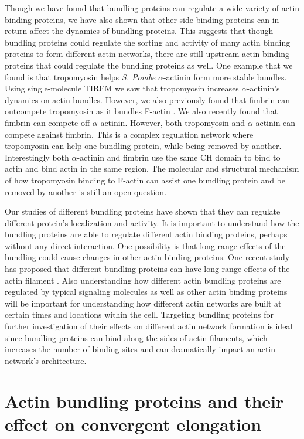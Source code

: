 Though we have found that bundling proteins can regulate a wide variety of actin binding proteins, we have also shown that other side binding proteins can in return affect the dynamics of bundling proteins. This suggests that though bundling proteins could regulate the sorting and activity of many actin binding proteins to form different actin networks, there are still upstream actin binding proteins that could regulate the bundling proteins as well. One example that we found is that tropomyosin helps \textit{S. Pombe} $\alpha$-actinin form more stable bundles. Using single-molecule TIRFM we saw that tropomyosin increases $\alpha$-actinin's dynamics on actin bundles. However, we also previously found that fimbrin can outcompete tropomyosin as it bundles F-actin \citep{christensen_competition_2017}. We also recently found that fimbrin can compete off $\alpha$-actinin. However, both tropomyosin and $\alpha$-actinin can compete against fimbrin. This is a complex regulation network where tropomyosin can help one bundling protein, while being removed by another. Interestingly both $\alpha$-actinin and fimbrin use the same CH domain to bind to actin and bind actin in the same region. The molecular and structural mechanism of how tropomyosin binding to F-actin can assist one bundling protein and be removed by another is still an open question. 

Our studies of different bundling proteins have shown that they can regulate different protein's localization and activity. It is important to understand how the bundling proteins are able to regulate different actin binding proteins, perhaps without any direct interaction. One possibility is that long range effects of the bundling could cause changes in other actin binding proteins. One recent study has proposed that different bundling proteins can have long range effects of the actin filament \citep{turmer_fascin_2015}. Also understanding how different actin bundling proteins are regulated by typical signaling molecules as well as other actin binding proteins will be important for understanding how different actin networks are built at certain times and locations within the cell. Targeting bundling proteins for further investigation of their effects on different actin network formation is ideal since bundling proteins can bind along the sides of actin filaments, which increases the number of binding sites and can dramatically impact an actin network's architecture.  

\section{Actin bundling proteins and their effect on convergent elongation}\label{bundler-conclusions}

